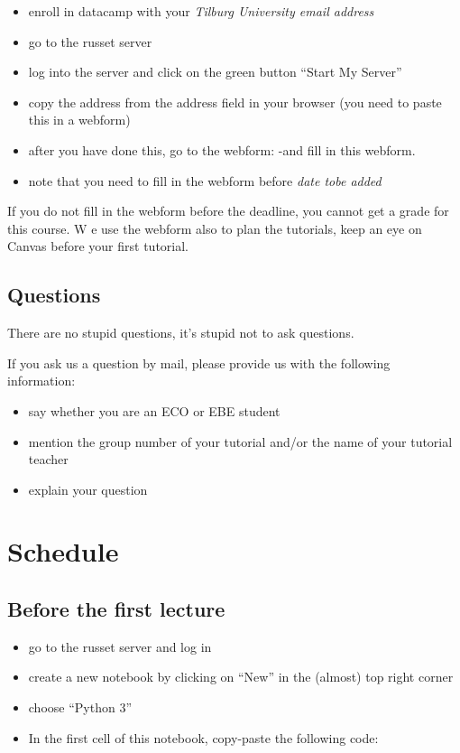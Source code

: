 \documentclass[]{book}
\providecommand{\tightlist}{%
  \setlength{\itemsep}{0pt}\setlength{\parskip}{0pt}}
\begin{document}
\begin{itemize}
\tightlist
\item
  enroll in datacamp with your \emph{Tilburg University email address}
\item
  go to the russet server
\item
  log into the server and click on the green button ``Start My Server''
\item
  copy the address from the address field in your browser (you need to
  paste this in a webform)
\item
  after you have done this, go to the webform: -and fill in this
  webform.
\item
  note that you need to fill in the webform before \emph{date tobe
  added}
\end{itemize}

If you do not fill in the webform before the deadline, you cannot get a
grade for this course. W e use the webform also to plan the tutorials,
keep an eye on Canvas before your first tutorial.

\section{Questions}\label{questions}

There are no stupid questions, it's stupid not to ask questions.

If you ask us a question by mail, please provide us with the following
information:

\begin{itemize}
\tightlist
\item
  say whether you are an ECO or EBE student
\item
  mention the group number of your tutorial and/or the name of your
  tutorial teacher
\item
  explain your question
\end{itemize}

\chapter{Schedule}\label{schedule}

\section{Before the first lecture}\label{before-the-first-lecture}

\begin{itemize}
\tightlist
\item
  go to the russet server and log in
\item
  create a new notebook by clicking on ``New'' in the (almost) top right
  corner
\item
  choose ``Python 3''
\item
  In the first cell of this notebook, copy-paste the following code:
\end{itemize}
\end{document}
